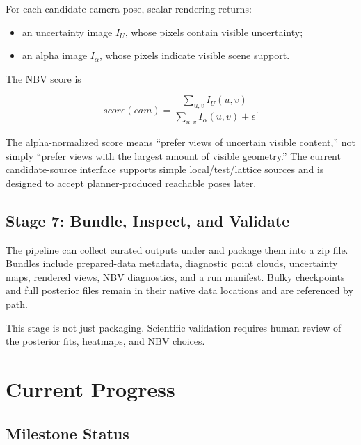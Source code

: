 \documentclass[11pt]{article}
\begin{document}
For each candidate camera pose, scalar rendering returns:

\begin{itemize}
  \item an uncertainty image \(I_U\), whose pixels contain visible uncertainty;
  \item an alpha image \(I_\alpha\), whose pixels indicate visible scene
        support.
\end{itemize}

The NBV score is

\[
  score(cam)
  =
  \frac{\sum_{u,v} I_U(u,v)}
       {\sum_{u,v} I_\alpha(u,v) + \epsilon}.
\]

The alpha-normalized score means ``prefer views of uncertain visible content,''
not simply ``prefer views with the largest amount of visible geometry.'' The
current candidate-source interface supports simple local/test/lattice sources
and is designed to accept planner-produced reachable poses later.

\subsection{Stage 7: Bundle, Inspect, and Validate}

The pipeline can collect curated outputs under  and
package them into a zip file. Bundles include prepared-data metadata,
diagnostic point clouds, uncertainty maps, rendered views, NBV diagnostics, and
a run manifest. Bulky checkpoints and full posterior files remain in their
native data locations and are referenced by path.

This stage is not just packaging. Scientific validation requires human review
of the posterior fits, heatmaps, and NBV choices.

\section{Current Progress}

\subsection{Milestone Status}
\end{document}
